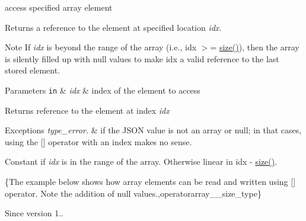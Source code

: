 access specified array element 

Returns a reference to the element at specified location {\itshape idx}.

\begin{DoxyNote}{Note}
If {\itshape idx} is beyond the range of the array (i.\+e., {\ttfamily idx $>$= \hyperlink{classnlohmann_1_1basic__json_a25e27ad0c6d53c01871c5485e1f75b96}{size()}}), then the array is silently filled up with {\ttfamily null} values to make {\ttfamily idx} a valid reference to the last stored element.
\end{DoxyNote}

\begin{DoxyParams}[1]{Parameters}
\mbox{\tt in}  & {\em idx} & index of the element to access\\
\hline
\end{DoxyParams}
\begin{DoxyReturn}{Returns}
reference to the element at index {\itshape idx} 
\end{DoxyReturn}

\begin{DoxyExceptions}{Exceptions}
{\em type\+\_\+error.} & if the J\+S\+ON value is not an array or null; in that cases, using the \mbox{[}\mbox{]} operator with an index makes no sense.\\
\hline
\end{DoxyExceptions}
Constant if {\itshape idx} is in the range of the array. Otherwise linear in {\ttfamily idx -\/ \hyperlink{classnlohmann_1_1basic__json_a25e27ad0c6d53c01871c5485e1f75b96}{size()}}.

\{The example below shows how array elements can be read and written using {\ttfamily \mbox{[}\mbox{]}} operator. Note the addition of {\ttfamily null} values.,operatorarray\+\_\+\+\_\+size\+\_\+type\}

\begin{DoxySince}{Since}
version 1.. 
\end{DoxySince}
